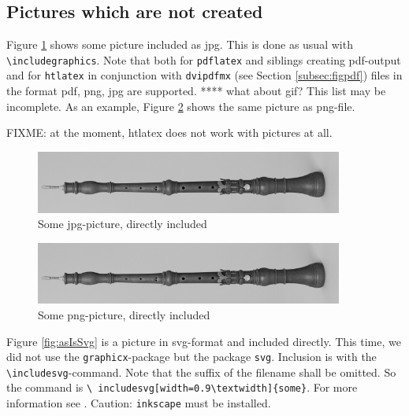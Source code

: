 \documentclass[12pt]{article}
\begin{document}
\subsection{Pictures which are not created}\label{subsec:picasis}

Figure \ref{fig:asIsJpg} shows some picture included as jpg. 
This is done as usual with {\tt\textbackslash includegraphics}. 
Note that both for {\tt pdflatex} and siblings creating pdf-output 
and for {\tt htlatex} in conjunction with {\tt dvipdfmx} 
(see Section \ref{subsec:figpdf}) 
files in the format pdf, \gls{png}, \gls{jpg} are supported. 
 **** what about \gls{gif}? 
This list may be incomplete. 
As an example, Figure \ref{fig:asIsPng} shows the same picture 
as png-file. 

FIXME: at the moment, htlatex does not work with pictures at all. 

\begin{figure}[htb]
\begin{center}
\includegraphics[width=0.9\textwidth]{06someJpgOboeBaroqueDennerMIR370.jpg}%
\end{center}
\caption{\label{fig:asIsJpg}Some jpg-picture, directly included }
\end{figure}

\begin{figure}[htb]
\begin{center}
\includegraphics[width=0.9\textwidth]{07somePngOboeBaroqueDennerMIR370.png}%
\end{center}
\caption{\label{fig:asIsPng}Some png-picture, directly included }
\end{figure}


Figure \ref{fig:asIsSvg} is a picture in \gls{svg}-format 
and included directly. 
This time, we did not use the {\tt graphicx}-package 
but the package {\tt svg}. 
Inclusion is with the {\tt\textbackslash includesvg}-command. 
Note that the suffix of the filename shall be omitted. 
So the command is {\tt \textbackslash
includesvg[width=0.9\textbackslash textwidth]\{some\}}. 
For more information see \cite{SvgP}. 
Caution: {\tt inkscape} must be installed. 
\end{document}
